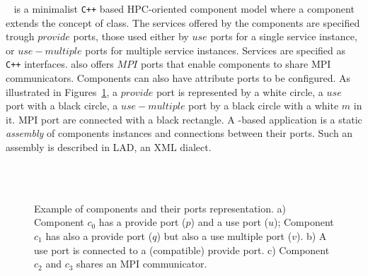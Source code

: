 \llc~\cite{l2c} is a minimalist \texttt{C++} based HPC-oriented component model
where a component extends the concept of class.
The services offered by the components are specified trough $provide$ ports,
those used either by $use$ ports for a single service instance,
or $use-multiple$ ports for multiple service instances.
Services are specified as \texttt{C++} interfaces.
\llc also offers $MPI$ ports that enable components to share MPI communicators.
Components can also have attribute ports to be configured.
%
As illustrated in Figures~\ref{fig:ports}, a $provide$ port is
represented by a white circle, a $use$
port with a black circle, a $use-multiple$ port by a black circle with
a white $m$ in it. MPI port are
connected with a black rectangle.
A \llc-based application is a static \emph{assembly} of components instances and connections between their ports.
Such an assembly is described in LAD, an XML dialect.

\begin{figure}[t]
\begin{center}
\\
\\
\caption{Example of components and their ports representation. a) Component $c_0$ has a provide port ($p$) and a use port ($u$); Component $c_1$ has also a provide port ($q$) but also a use multiple port ($v$). b) A use port is connected to a (compatible) provide port. c) Component $c_2$ and $c_3$ shares an MPI communicator.}
\label{fig:ports}
\end{center}
\end{figure}

